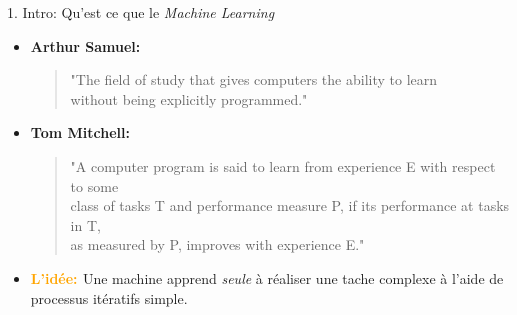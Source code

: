 \begin{frame}{1. Intro: Qu'est ce que le \textit{Machine Learning}}
  \begin{itemize}
  \item \textbf{Arthur Samuel:}
    \begin{center}
      \begin{quote}
        \centering
        "The field of study that gives computers the ability to learn\\ without being explicitly programmed."
      \end{quote}
    \end{center}
  \item \textbf{Tom Mitchell:}
    \begin{center}
      \begin{quote}
        \centering
        "A computer program is said to learn from experience E with respect to some\\ class of tasks T and performance measure P, if its performance at tasks in T,\\ as measured by P, improves with experience E."
      \end{quote}
    \end{center}
    \vspace{0.5cm}
  \item \textbf{\textcolor{orange}{L'idée: }} Une machine apprend \textit{seule} à réaliser une tache complexe à l'aide de processus itératifs simple.
  \end{itemize}
\end{frame}


